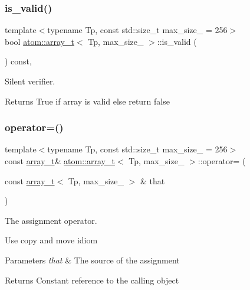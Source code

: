 \subsubsection{\texorpdfstring{is\+\_\+valid()}{is\_valid()}}
{\footnotesize\ttfamily template$<$typename Tp, const std\+::size\+\_\+t max\+\_\+size\+\_\+ = 256$>$ \\
bool \hyperlink{classatom_1_1array__t}{atom\+::array\+\_\+t}$<$ Tp, max\+\_\+size\+\_\+ $>$\+::is\+\_\+valid (\begin{DoxyParamCaption}{ }\end{DoxyParamCaption}) const\hspace{0.3cm}{\ttfamily [inline]}, {\ttfamily [noexcept]}}



Silent verifier. 

\begin{DoxyReturn}{Returns}
True if array is valid else return false 
\end{DoxyReturn}
\mbox{\label{classatom_1_1array__t_aee988e07623e2c643765a286eb52eea6}} 
\subsubsection{\texorpdfstring{operator=()}{operator=()}}
{\footnotesize\ttfamily template$<$typename Tp, const std\+::size\+\_\+t max\+\_\+size\+\_\+ = 256$>$ \\
const \hyperlink{classatom_1_1array__t}{array\+\_\+t}\& \hyperlink{classatom_1_1array__t}{atom\+::array\+\_\+t}$<$ Tp, max\+\_\+size\+\_\+ $>$\+::operator= (\begin{DoxyParamCaption}\item[{const \hyperlink{classatom_1_1array__t}{array\+\_\+t}$<$ Tp, max\+\_\+size\+\_\+ $>$ \&}]{that }\end{DoxyParamCaption})\hspace{0.3cm}{\ttfamily [inline]}}



The assignment operator. 

Use copy and move idiom 
\begin{DoxyParams}{Parameters}
{\em that} & The source of the assignment \\
\hline
\end{DoxyParams}
\begin{DoxyReturn}{Returns}
Constant reference to the calling object 
\end{DoxyReturn}
\mbox{\label{classatom_1_1array__t_aa6995427dae0b4a3ce63d8fd47ed3121}} 
